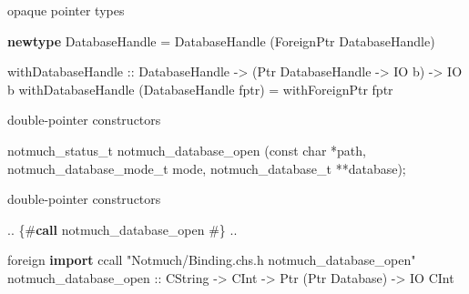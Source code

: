 \documentclass[ignorenonframetext,aspectratio=169]{beamer}
\newenvironment{Shaded}{}{}
\newcommand{\KeywordTok}[1]{\textcolor[rgb]{0.00,0.44,0.13}{\textbf{{#1}}}}
\newcommand{\DataTypeTok}[1]{\textcolor[rgb]{0.56,0.13,0.00}{{#1}}}
\newcommand{\StringTok}[1]{\textcolor[rgb]{0.25,0.44,0.63}{{#1}}}
\newcommand{\OtherTok}[1]{\textcolor[rgb]{0.00,0.44,0.13}{{#1}}}
\newcommand{\FunctionTok}[1]{\textcolor[rgb]{0.02,0.16,0.49}{{#1}}}
\newcommand{\NormalTok}[1]{{#1}}
\begin{document}
\begin{frame}[fragile]{opaque pointer types}

\begin{Shaded}
\begin{Highlighting}[]
\KeywordTok{newtype} \DataTypeTok{DatabaseHandle} \FunctionTok{=} \DataTypeTok{DatabaseHandle} \NormalTok{(}\DataTypeTok{ForeignPtr} \DataTypeTok{DatabaseHandle}\NormalTok{)}

\NormalTok{withDatabaseHandle}
\OtherTok{  ::} \DataTypeTok{DatabaseHandle} \OtherTok{->} \NormalTok{(}\DataTypeTok{Ptr} \DataTypeTok{DatabaseHandle} \OtherTok{->} \DataTypeTok{IO} \NormalTok{b) }\OtherTok{->} \DataTypeTok{IO} \NormalTok{b}
\NormalTok{withDatabaseHandle (}\DataTypeTok{DatabaseHandle} \NormalTok{fptr) }\FunctionTok{=}
  \NormalTok{withForeignPtr fptr}
\end{Highlighting}
\end{Shaded}

\end{frame}

\begin{frame}[fragile]{double-pointer constructors}

\begin{Shaded}
\begin{Highlighting}[]
\NormalTok{notmuch_status_t}
\NormalTok{notmuch_database_open (}\DataTypeTok{const} \DataTypeTok{char} \NormalTok{*path,}
                       \NormalTok{notmuch_database_mode_t mode,}
                       \NormalTok{notmuch_database_t **database);}
\end{Highlighting}
\end{Shaded}

\end{frame}

\begin{frame}[fragile]{double-pointer constructors}

\begin{Shaded}
\begin{Highlighting}[]
\FunctionTok{..} \StringTok{\{#}\KeywordTok{call}\StringTok{ notmuch_database_open #\}} \FunctionTok{..}

\NormalTok{foreign }\KeywordTok{import }\NormalTok{ccall "}\DataTypeTok{Notmuch}\NormalTok{/Binding.chs.h notmuch_database_open"}
  \NormalTok{notmuch_database_open}
\OtherTok{    ::} \DataTypeTok{CString} \OtherTok{->} \DataTypeTok{CInt} \OtherTok{->} \DataTypeTok{Ptr} \NormalTok{(}\DataTypeTok{Ptr} \DataTypeTok{Database}\NormalTok{) }\OtherTok{->} \DataTypeTok{IO} \DataTypeTok{CInt}
\end{Highlighting}
\end{Shaded}

\end{frame}
\end{document}
